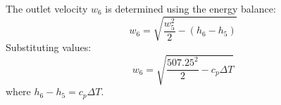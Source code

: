 The outlet velocity \( w_6 \) is determined using the energy balance:  
\[
w_6 = \sqrt{\frac{w_5^2}{2} - (h_6 - h_5)}
\]  
Substituting values:  
\[
w_6 = \sqrt{\frac{507.25^2}{2} - c_p \Delta T}
\]  
where \( h_6 - h_5 = c_p \Delta T \).